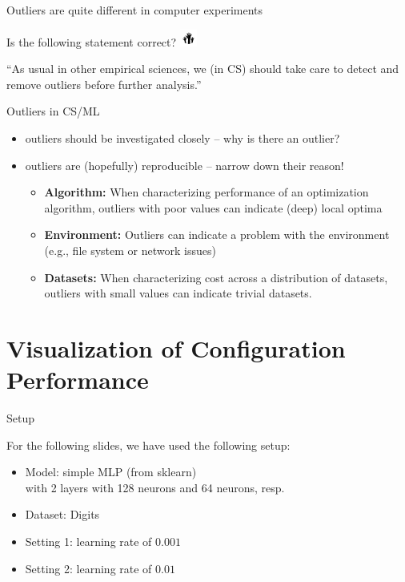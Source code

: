 \begin{frame}[c]{Outliers are quite different in computer experiments}

Is the following statement correct? \includegraphics[height=1.5em]{images/hands}

``As usual in other empirical sciences, we (in CS) should take care to \alert{detect and remove outliers} before further analysis.''

\pause
\bigskip

\begin{block}{Outliers in CS/ML}
\begin{itemize}
	\item outliers should be investigated closely -- why is there an outlier?
	\item outliers are (hopefully) reproducible -- narrow down their reason!
	\pause
	\begin{itemize}
		\item \textbf{Algorithm:} When characterizing performance of an optimization algorithm, \alert{outliers with poor values can indicate (deep) local optima}
		\pause
		\item \textbf{Environment:} Outliers can indicate a \alert{problem with the environment} (e.g., file system or network issues)
		\pause
		\item \textbf{Datasets:}  When characterizing cost across a distribution of datasets, outliers with small values can indicate trivial datasets.
	\end{itemize}
\end{itemize}
\end{block}

\end{frame}
\section{Visualization of Configuration Performance}
\begin{frame}[c]{Setup}

For the following slides, we have used the following setup:

\begin{itemize}
	\item Model: simple MLP (from sklearn)\\ with 2 layers with 128 neurons and 64 neurons, resp.
	\item Dataset: Digits  
	\item Setting 1: learning rate of $0.001$ 
	\item Setting 2: learning rate of $0.01$
\end{itemize}


\end{frame}

